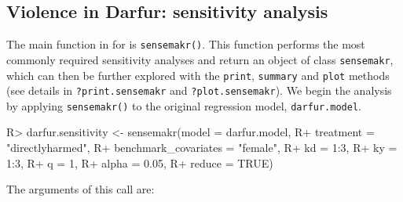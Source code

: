 \documentclass[
]{jss}
\begin{document}
\hypertarget{darfur_sensitivity}{%
\subsection{Violence in Darfur: sensitivity
analysis}\label{darfur_sensitivity}}

The main function in  for  is
\texttt{sensemakr()}. This function performs the most commonly required
sensitivity analyses and return an object of class \texttt{sensemakr},
which can then be further explored with the \texttt{print},
\texttt{summary} and \texttt{plot} methods (see details in
\texttt{?print.sensemakr} and \texttt{?plot.sensemakr}). We begin the
analysis by applying \texttt{sensemakr()} to the original regression
model, \texttt{darfur.model}.

\begin{CodeChunk}

\begin{CodeInput}
R> darfur.sensitivity <- sensemakr(model = darfur.model, 
R+                                 treatment = "directlyharmed",
R+                                 benchmark_covariates = "female",
R+                                 kd = 1:3,
R+                                 ky = 1:3, 
R+                                 q = 1,
R+                                 alpha = 0.05, 
R+                                 reduce = TRUE)
\end{CodeInput}
\end{CodeChunk}

The arguments of this call are:
\end{document}
